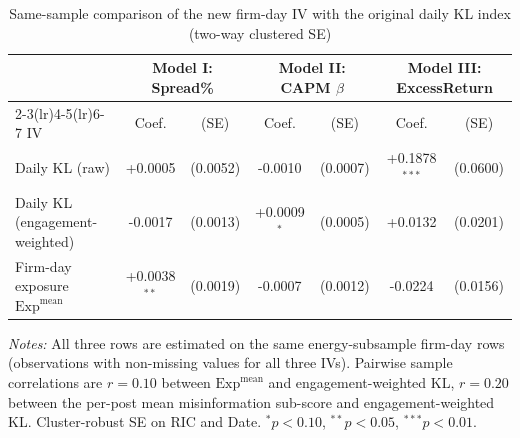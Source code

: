 \begin{table}[htbp]
\centering
\caption{Same-sample comparison of the new firm-day IV with the original daily KL index (two-way clustered SE)}
\label{tab:v2_compare_kl}
\begin{threeparttable}
\begin{tabular}{l c c c c c c}
\toprule
 & \multicolumn{2}{c}{Model I: Spread\%} & \multicolumn{2}{c}{Model II: CAPM $\beta$} & \multicolumn{2}{c}{Model III: ExcessReturn} \\
\cmidrule(lr){2-3}\cmidrule(lr){4-5}\cmidrule(lr){6-7}
IV & Coef. & (SE) & Coef. & (SE) & Coef. & (SE) \\
\midrule
Daily KL (raw) & +0.0005 & (0.0052) & -0.0010 & (0.0007) & +0.1878$^{***}$ & (0.0600) \\
Daily KL (engagement-weighted) & -0.0017 & (0.0013) & +0.0009$^{*}$ & (0.0005) & +0.0132 & (0.0201) \\
Firm-day exposure $\mathrm{Exp}^{\text{mean}}$ & +0.0038$^{**}$ & (0.0019) & -0.0007 & (0.0012) & -0.0224 & (0.0156) \\
\bottomrule
\end{tabular}
\begin{tablenotes}\small
\item \textit{Notes:} All three rows are estimated on the same energy-subsample firm-day rows
(observations with non-missing values for all three IVs). Pairwise sample correlations are
$r=0.10$ between $\mathrm{Exp}^{\text{mean}}$ and engagement-weighted KL, $r=0.20$ between the
per-post mean misinformation sub-score and engagement-weighted KL. Cluster-robust SE on RIC and Date.
$^{*}p<0.10$, $^{**}p<0.05$, $^{***}p<0.01$.
\end{tablenotes}
\end{threeparttable}
\end{table}